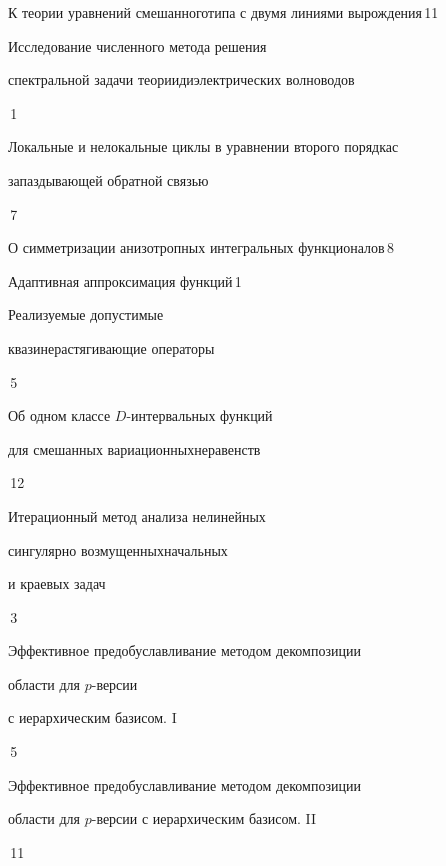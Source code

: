 

{К теории уравнений смешанного\newline типа с двумя линиями вырождения}{\No\,11}




{Исследование численного метода решения


спектральной задачи теории\newline диэлектрических волноводов}{\No\,1}




{Локальные и нелокальные циклы в уравнении второго порядка\newline с


запаздывающей обратной связью}{\No\,7}




{О симметризации анизотропных интегральных функционалов}{\No\,8}




{Адаптивная аппроксимация функций}{\No\,1}




{Реализуемые допустимые


квазинерастягивающие операторы}{\No\,5}




{Об одном классе $D$-интервальных функций 


для смешанных вариационных\newline неравенств}{\No\,12}




{Итерационный метод анализа нелинейных 


сингулярно возмущенных\newline начальных 


и краевых задач}{\No\,3}




{Эффективное предобуславливание методом декомпозиции\newline


области для $p$-версии


с иерархическим базисом. I}{\No\,5}




{Эффективное предобуславливание методом декомпозиции \newline


области для $p$-версии с иерархическим базисом. II}{\No\,11}


